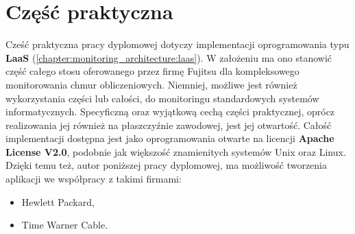 \chapter{Część praktyczna}
\label{chapter:application}

Cześć praktyczna pracy dyplomowej dotyczy implementacji oprogramowania typu \textbf{LaaS} (\ref{chapter:monitoring_architecture:laas}).
W założeniu ma ono stanowić część całego stosu oferowanego przez firmę Fujitsu dla kompleksowego monitorowania chmur obliczeniowych.
Niemniej, możliwe jest również wykorzystania części lub całości, do monitoringu standardowych systemów informatycznych. 
Specyficzną oraz wyjątkową cechą części praktycznej, oprócz realizowania jej również na płaszczyźnie zawodowej, jest jej otwartość.
Całość implementacji dostępna jest jako oprogramowania otwarte na licencji \textbf{Apache License V2.0}, podobnie jak większość
znamienitych systemów Unix oraz Linux. Dzięki temu też, autor poniższej pracy dyplomowej, ma możliwość tworzenia aplikacji
we współpracy z takimi firmami:
\begin{itemize}
    \item Hewlett Packard,
    \item Time Warner Cable.
\end{itemize}







